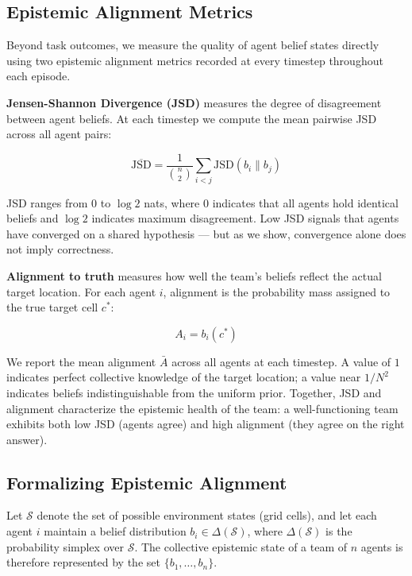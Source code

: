\documentclass[pdflatex,sn-mathphys-num]{sn-jnl}%
\theoremstyle{thmstyleone}%
\theoremstyle{thmstyletwo}%
\theoremstyle{thmstylethree}%
\begin{document}
\subsection{Epistemic Alignment Metrics}

Beyond task outcomes, we measure the quality of agent belief states
directly using two epistemic alignment metrics recorded at every
timestep throughout each episode.

\textbf{Jensen-Shannon Divergence (JSD)} measures the degree of
disagreement between agent beliefs. At each timestep we compute the
mean pairwise JSD across all agent pairs:

\begin{equation}
    \overline{\text{JSD}} = \frac{1}{\binom{n}{2}}
    \sum_{i < j} \text{JSD}(b_i \| b_j)
\end{equation}

JSD ranges from $0$ to $\log 2$ nats, where $0$ indicates that all
agents hold identical beliefs and $\log 2$ indicates maximum
disagreement. Low JSD signals that agents have converged on a shared
hypothesis --- but as we show, convergence alone does not imply
correctness.

\textbf{Alignment to truth} measures how well the team's beliefs
reflect the actual target location. For each agent $i$, alignment is
the probability mass assigned to the true target cell $c^*$:

\begin{equation}
    A_i = b_i(c^*)
\end{equation}

We report the mean alignment $\bar{A}$ across all agents at each
timestep. A value of $1$ indicates perfect collective knowledge of the
target location; a value near $1/N^2$ indicates beliefs
indistinguishable from the uniform prior. Together, JSD and alignment
characterize the epistemic health of the team: a well-functioning team
exhibits both low JSD (agents agree) and high alignment (they agree on
the right answer).

\subsection{Formalizing Epistemic Alignment}

Let $\mathcal{S}$ denote the set of possible environment states (grid cells), and let each agent $i$ maintain a belief distribution $b_i \in \Delta(\mathcal{S})$, where $\Delta(\mathcal{S})$ is the probability simplex over $\mathcal{S}$. The collective epistemic state of a team of $n$ agents is therefore represented by the set $\{b_1, \dots, b_n\}$.
\end{document}
